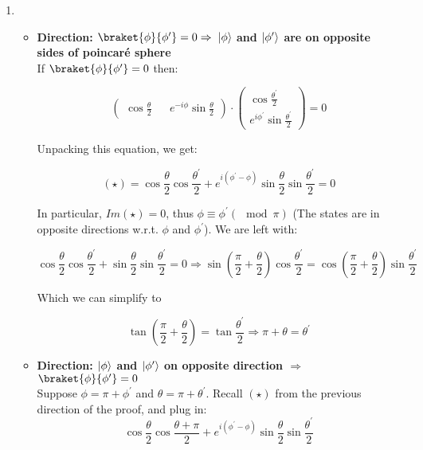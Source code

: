 \documentclass[a4paper,10pt]{hw}
\DeclarePairedDelimiter\ket{\lvert}{\rangle}
\begin{document}
\begin{enumerate}

\item

\begin{itemize}

	\item \textbf{Direction: $\braket{\phi}{\phi^\prime} = 0 \Rightarrow$ $\ket{\phi}$ and $\ket{\phi^\prime}$ are on opposite sides of poincar\'{e} sphere } \\
	
	If $\braket{\phi}{\phi^\prime} = 0$ then:
	
	$$
	\begin{pmatrix}
	\cos{\frac{\theta}{2}} && e^{-i\phi}\sin{\frac{\theta}{2}}
	\end{pmatrix}
	\cdot
	\begin{pmatrix}
	\cos{\frac{\theta^\prime}{2}} \\ e^{i\phi^\prime}\sin{\frac{\theta^\prime}{2}}
	\end{pmatrix}
	=
	0
	$$

	Unpacking this equation, we get:
	
	$$
	(\star) = \cos{\frac{\theta}{2}} \cos{\frac{\theta^\prime}{2}} + e^{i(\phi^\prime - \phi)}\sin{\frac{\theta}{2}} \sin{\frac{\theta^\prime}{2}} = 0
	$$
	
	In particular, $Im(\star) = 0$, thus $\phi \equiv \phi^\prime(\mod\pi)$ (The states are in opposite directions w.r.t. $\phi$ and $\phi^\prime$). We are left with:
	
	$$
	\cos{\frac{\theta}{2}} \cos{\frac{\theta^\prime}{2}} + \sin{\frac{\theta}{2}} \sin{\frac{\theta^\prime}{2}} = 0 \Rightarrow \sin\left(\frac{\pi}{2} + \frac{\theta}{2}\right)\cos{\frac{\theta^\prime}{2}} = \cos\left(\frac{\pi}{2} + \frac{\theta}{2}\right)\sin{\frac{\theta^\prime}{2}}
	$$
	
	Which we can simplify to
	
	$$
	\tan\left(\frac{\pi}{2} + \frac{\theta}{2}\right) = \tan{\frac{\theta^\prime}{2}}
	\Rightarrow
	\pi + \theta = \theta^\prime
	$$
	
	\item \textbf{Direction: $\ket{\phi}$ and $\ket{\phi^\prime}$ on opposite direction $\Rightarrow$ $\braket{\phi}{\phi^\prime} = 0$} \\
	Suppose $\phi = \pi + \phi^\prime$ and $\theta = \pi + \theta^\prime$. Recall $(\star)$ from the previous direction of the proof, and plug in:
	$$
	\cos{\frac{\theta}{2}} \cos{\frac{\theta + \pi}{2}} + e^{i(\phi^\prime - \phi)}\sin{\frac{\theta}{2}} \sin{\frac{\theta^\prime}{2}}
	$$
\end{itemize}

\end{enumerate}
\end{document}
